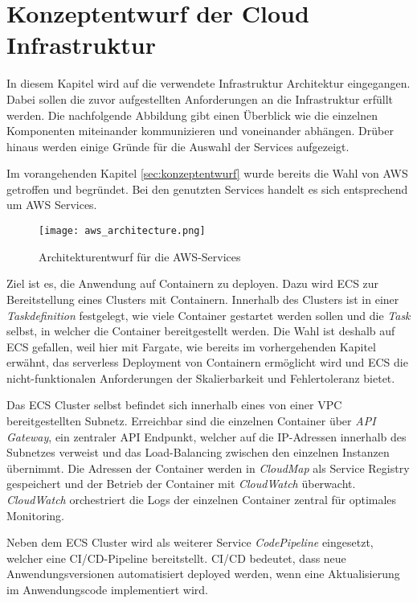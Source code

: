 \section{Konzeptentwurf der Cloud Infrastruktur}
In diesem Kapitel wird auf die verwendete Infrastruktur Architektur eingegangen. Dabei sollen die zuvor aufgestellten Anforderungen an die Infrastruktur erfüllt werden. Die nachfolgende Abbildung gibt einen Überblick wie die einzelnen Komponenten miteinander kommunizieren und voneinander abhängen. Drüber hinaus werden einige Gründe für die Auswahl der Services aufgezeigt.

Im vorangehenden Kapitel \ref{sec:konzeptentwurf} wurde bereits die Wahl von \ac{AWS} getroffen und begründet. Bei den genutzten Services handelt es sich entsprechend um \ac{AWS} Services.

\begin{figure}[H]
    \centering
    \texttt{[image: aws\_architecture.png]}
    \caption{Architekturentwurf für die AWS-Services}
    \label{fig:CloudArchitektur}
\end{figure}

Ziel ist es, die Anwendung auf Containern zu deployen. Dazu wird \ac{ECS} zur Bereitstellung eines Clusters mit Containern. Innerhalb des Clusters ist in einer \textit{Taskdefinition} festgelegt, wie viele Container gestartet werden sollen und die \textit{Task} selbst, in welcher die Container bereitgestellt werden. Die Wahl ist deshalb auf \ac{ECS} gefallen, weil hier mit \gls{Fargate}, wie bereits im vorhergehenden Kapitel erwähnt, das serverless Deployment von Containern ermöglicht wird und \ac{ECS} die nicht-funktionalen Anforderungen der Skalierbarkeit und Fehlertoleranz bietet. \pagebreak

Das \ac{ECS} Cluster selbst befindet sich innerhalb eines von einer \ac{VPC} bereitgestellten Subnetz. Erreichbar sind die einzelnen Container über \textit{API Gateway}, ein zentraler API Endpunkt, welcher auf die IP-Adressen innerhalb des Subnetzes verweist und das Load-Balancing zwischen den einzelnen Instanzen übernimmt. Die Adressen der Container werden in \textit{CloudMap} als Service Registry gespeichert und der Betrieb der Container mit \textit{CloudWatch} überwacht. \textit{CloudWatch} orchestriert die Logs der einzelnen Container zentral für optimales Monitoring.

Neben dem \ac{ECS} Cluster wird als weiterer Service \textit{\gls{CodePipeline}} eingesetzt, welcher eine \ac{CI/CD}-Pipeline bereitstellt. \ac{CI/CD} bedeutet, dass neue Anwendungsversionen automatisiert deployed werden, wenn eine Aktualisierung im Anwendungscode implementiert wird. 

